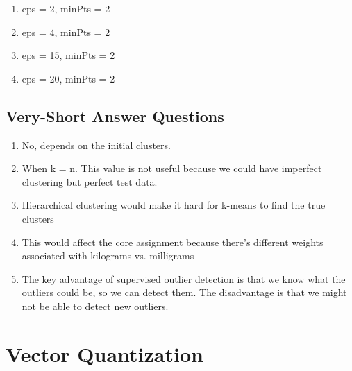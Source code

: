 \documentclass{article}
\def\enum#1{\begin{enumerate}#1\end{enumerate}}
\begin{document}
{\enum{
\item eps = 2, minPts = 2
\item eps = 4, minPts = 2
\item eps = 15, minPts = 2
\item eps = 20, minPts = 2 
}

\subsection{Very-Short Answer Questions}

\enum{
\item No, depends on the initial clusters. 
\item When k = n. This value is not useful because we could have imperfect clustering but perfect test data. 
\item Hierarchical clustering would make it hard for k-means to find the true clusters 
\item This would affect the core assignment because there's different weights associated with kilograms vs. milligrams  
\item The key advantage of supervised outlier detection is that we know what the outliers could be, so we can detect them. The disadvantage is that we might not be able to detect new outliers.
}


\section{Vector Quantization}

}
\end{document}
